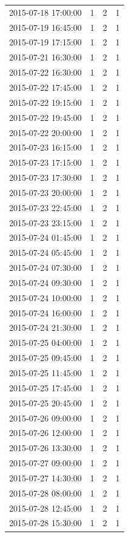 \begin{tabular}{lrrr}
2015-07-18 17:00:00 & 1 & 2 & 1 \\
2015-07-19 16:45:00 & 1 & 2 & 1 \\
2015-07-19 17:15:00 & 1 & 2 & 1 \\
2015-07-21 16:30:00 & 1 & 2 & 1 \\
2015-07-22 16:30:00 & 1 & 2 & 1 \\
2015-07-22 17:45:00 & 1 & 2 & 1 \\
2015-07-22 19:15:00 & 1 & 2 & 1 \\
2015-07-22 19:45:00 & 1 & 2 & 1 \\
2015-07-22 20:00:00 & 1 & 2 & 1 \\
2015-07-23 16:15:00 & 1 & 2 & 1 \\
2015-07-23 17:15:00 & 1 & 2 & 1 \\
2015-07-23 17:30:00 & 1 & 2 & 1 \\
2015-07-23 20:00:00 & 1 & 2 & 1 \\
2015-07-23 22:45:00 & 1 & 2 & 1 \\
2015-07-23 23:15:00 & 1 & 2 & 1 \\
2015-07-24 01:45:00 & 1 & 2 & 1 \\
2015-07-24 05:45:00 & 1 & 2 & 1 \\
2015-07-24 07:30:00 & 1 & 2 & 1 \\
2015-07-24 09:30:00 & 1 & 2 & 1 \\
2015-07-24 10:00:00 & 1 & 2 & 1 \\
2015-07-24 16:00:00 & 1 & 2 & 1 \\
2015-07-24 21:30:00 & 1 & 2 & 1 \\
2015-07-25 04:00:00 & 1 & 2 & 1 \\
2015-07-25 09:45:00 & 1 & 2 & 1 \\
2015-07-25 11:45:00 & 1 & 2 & 1 \\
2015-07-25 17:45:00 & 1 & 2 & 1 \\
2015-07-25 20:45:00 & 1 & 2 & 1 \\
2015-07-26 09:00:00 & 1 & 2 & 1 \\
2015-07-26 12:00:00 & 1 & 2 & 1 \\
2015-07-26 13:30:00 & 1 & 2 & 1 \\
2015-07-27 09:00:00 & 1 & 2 & 1 \\
2015-07-27 14:30:00 & 1 & 2 & 1 \\
2015-07-28 08:00:00 & 1 & 2 & 1 \\
2015-07-28 12:45:00 & 1 & 2 & 1 \\
2015-07-28 15:30:00 & 1 & 2 & 1 \\

\end{tabular}

